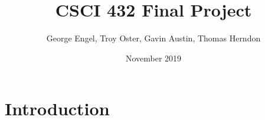 \documentclass{article}
\title{CSCI 432 Final Project}
\author{George Engel, Troy Oster, Gavin Austin, Thomas Herndon}
\date{November 2019}
\begin{document}
\maketitle

\section{Introduction}
\end{document}
